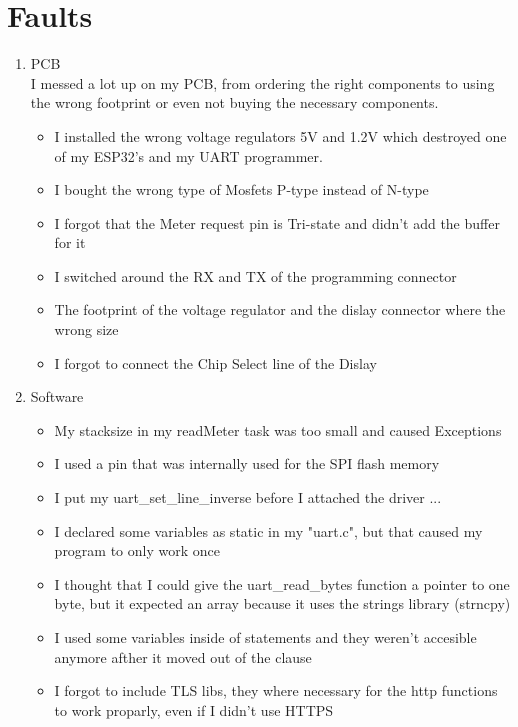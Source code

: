 \documentclass[a4paper,twoside, 12pt]{report}
\theoremstyle{break}
\begin{document}
\section{Faults}
\begin{enumerate}
\item PCB\\
	I messed a lot up on my PCB, from ordering the right components to using the wrong footprint or even not buying the necessary components.\\
	\begin{itemize}
	\item I installed the wrong voltage regulators 5V and 1.2V which destroyed one of my ESP32's and my UART programmer.
	\item I bought the wrong type of Mosfets P-type instead of N-type
	\item I forgot that the Meter request pin is Tri-state and didn't add the buffer for it
	\item I switched around the RX and TX of the programming connector
	\item The footprint of the voltage regulator and the dislay connector where the wrong size
	\item I forgot to connect the Chip Select line of the Dislay
	\end{itemize}
	\item Software
	\begin{itemize}
		\item My stacksize in my readMeter task was too small and caused Exceptions
		\item I used a pin that was internally used for the SPI flash memory
		\item I put my uart\_set\_line\_inverse before I attached the driver ...
		\item I declared some variables as static in my "uart.c", but that caused my program to only work once
		\item I thought that I could give the uart\_read\_bytes function a pointer to one byte, but it expected an array because it uses the strings library (strncpy)
		\item I used some variables inside of statements and they weren't accesible anymore afther it moved out of the clause
		\item I forgot to include TLS libs, they where necessary for the http functions to work proparly, even if I didn't use HTTPS
	\end{itemize}
\end{enumerate}
\end{document}
